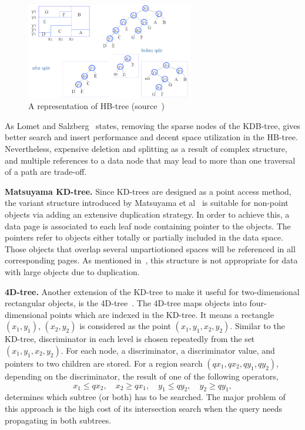 \documentclass[a4paper,12pt]{article}
\begin{document}
\begin{figure}
\centering
\includegraphics[width=0.65\textwidth,height=0.2\textheight]{hbtree}
\caption{A representation of HB-tree (source~\cite{hbtree1})}
\label{fighbtree}
\end{figure}

As Lomet and Salzberg~\cite{hbtree1} states, removing the sparse nodes of the KDB-tree, gives better search and insert performance and decent space utilization in the HB-tree. Nevertheless, expensive deletion and splitting as a result of complex structure, and multiple references to a data node that may lead to more than one traversal of a path are trade-off.

\textbf{Matsuyama KD-tree.} Since KD-trees are designed as a point access method, the variant structure introduced by Matsuyama et al~\cite{matsuyama} is suitable for non-point objects via adding an extensive duplication strategy. In order to achieve this, a data page is associated to each leaf node containing pointer to the objects. The pointers refer to objects either totally or partially included in the data space. Those objects that overlap several unpartiotioned spaces will be referenced in all corresponding pages. As mentioned in~\cite{survey}, this structure is not appropriate for data with large objects due to duplication.

\textbf{4D-tree.} Another extension of the KD-tree to make it useful for two-dimensional rectangular objects, is the 4D-tree~\cite{4dtree}. The 4D-tree maps objects into four-dimensional points which are indexed in the KD-tree. It means a rectangle $(x‍‍_1, y_1)$, $(x_2, y_2)$ is considered as the point $(x‍‍_1, y_1, x_2, y_2)$. Similar to the 	KD-tree, discriminator in each level is chosen repeatedly from the set $(x‍‍_1, y_1, x_2, y_2)$. For each node, a discriminator, a discriminator value, and pointers to two children are stored. 
For a region search $(qx_1, qx_2, qy_1, qy_2)$, depending on the discriminator, the result of one of the following operators,
$$x_1 \leq qx_2, \quad x_2 \geq qx_1, \quad y_1 \leq qy_2, \quad y_2 \geq qy_1,$$ 
determines which subtree (or both) has to be searched.
The major problem of this approach is the high cost of its intersection search when the query needs propagating in both subtrees. 
\end{document}
